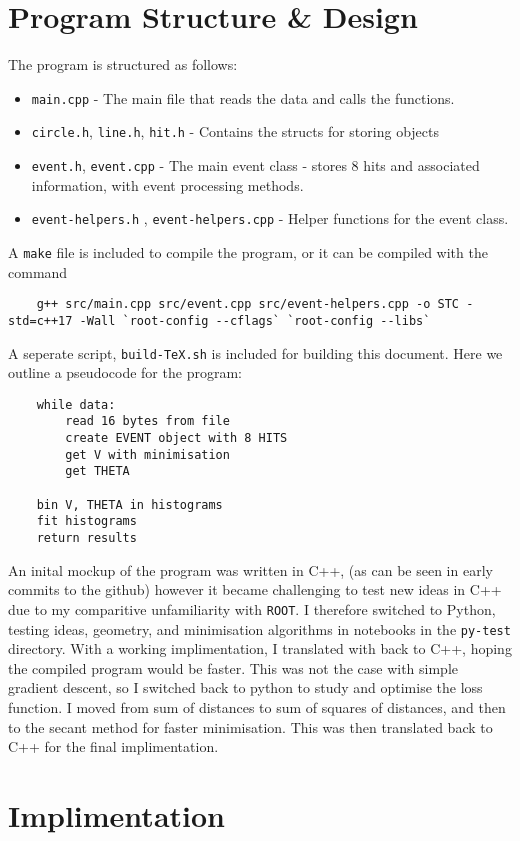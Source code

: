 \documentclass[11pt]{article}
\begin{document}
\section{Program Structure \& Design}
\label{sec:program}
The program is structured as follows:
\begin{itemize}
    \item \texttt{main.cpp} - The main file that reads the data and calls the functions.
    \item \texttt{circle.h}, \texttt{line.h}, \texttt{hit.h} - Contains the structs for storing objects
    \item \texttt{event.h}, \texttt{event.cpp} - The main event class - stores 8 hits and associated information, with event processing methods.
    \item \texttt{event-helpers.h} , \texttt{event-helpers.cpp} - Helper functions for the event class.
\end{itemize}
A \texttt{make} file is included to compile the program, or it can be compiled with the command
\begin{verbatim}
    g++ src/main.cpp src/event.cpp src/event-helpers.cpp -o STC -std=c++17 -Wall `root-config --cflags` `root-config --libs`
\end{verbatim}
A seperate script, \texttt{build-TeX.sh} is included for building this document. Here we outline a pseudocode for the program:
\begin{verbatim}
    while data:
        read 16 bytes from file
        create EVENT object with 8 HITS
        get V with minimisation
        get THETA
    
    bin V, THETA in histograms
    fit histograms
    return results
\end{verbatim}
An inital mockup of the program was written in C++, (as can be seen in early commits to the github) however it became challenging to test new ideas in C++ due to my comparitive unfamiliarity with \texttt{ROOT}. I therefore switched to Python, testing ideas, geometry, and minimisation algorithms in notebooks in the \texttt{py-test} directory. With a working implimentation, I translated with back to C++, hoping the compiled program would be faster. This was not the case with simple gradient descent, so I switched back to python to study and optimise the loss function. I moved from sum of distances to sum of squares of distances, and then to the secant method for faster minimisation. This was then translated back to C++ for the final implimentation.

\section{Implimentation}
\label{sec:implimentation}
\end{document}
